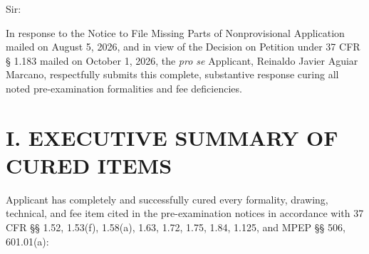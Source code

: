 \documentclass[11pt,letterpaper]{article}
\begin{document}
\vspace{0.3cm}
\noindent Sir:

\noindent In response to the Notice to File Missing Parts of Nonprovisional Application mailed on August 5, 2026, and in view of the Decision on Petition under 37 CFR \S{} 1.183 mailed on October 1, 2026, the \textit{pro se} Applicant, Reinaldo Javier Aguiar Marcano, respectfully submits this complete, substantive response curing all noted pre-examination formalities and fee deficiencies.

\section*{I. EXECUTIVE SUMMARY OF CURED ITEMS}

Applicant has completely and successfully cured every formality, drawing, technical, and fee item cited in the pre-examination notices in accordance with 37 CFR \S\S{} 1.52, 1.53(f), 1.58(a), 1.63, 1.72, 1.75, 1.84, 1.125, and MPEP \S\S{} 506, 601.01(a):
\end{document}
